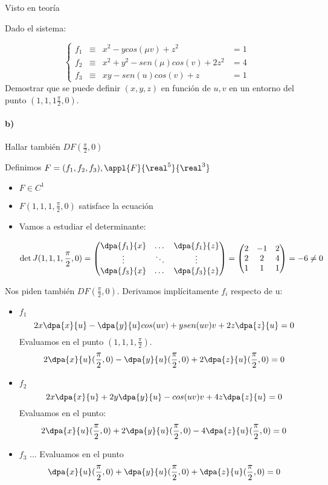  \begin{problem}[18]
 \solution
 Visto en teoría
 \end{problem}
\begin{problem}[19]
Dado el sistema:

\[\left\{\begin{array}{cccc}
	 f_1 &\equiv& x^2 -ycos(\mu v) + z^2 &= 1\\
	f_2 &\equiv &x^2+y^2-sen(\mu)cos(v)+2z^2 &= 4\\
	f_3 &\equiv &xy-sen(u)cos(v) + z &= 1 \end{array} \right.\]
Demostrar que se puede definir $(x,y,z)$ en función de $u,v$ en un entorno del punto $(1,1,1\frac{\pi}{2},0) $.

\paragraph{b)} Hallar también $DF(\frac{\pi}{2},0) $

\solution
	
Definimos $F = (f_1,f_2,f_3), \appl{F}{\real^5}{\real^3}$

\begin{itemize}
\item $F \in C^1$
\item $F(1,1,1,\frac{\pi}{2},0)$ satisface la ecuación
\item Vamos a estudiar el determinante:

\[\det J(1,1,1,\frac{\pi}{2},0) = 
	\begin{pmatrix}
		\dpa{f_1}{x} &\dots &\dpa{f_1}{z}\\
		\vdots & \ddots &\vdots\\
		\dpa{f_3}{x} & \dots & \dpa{f_3}{z}
	\end{pmatrix} =
	\begin{pmatrix}
		2&-1&2\\
		2&2&4\\
		1&1&1
	\end{pmatrix} = -6 \neq 0\]	
\end{itemize}

Nos piden también $DF(\frac{\pi}{2},0)$. Derivamos implícitamente $f_i$ respecto de u:

\begin{itemize}
\item $f_1$
\[2x\dpa{x}{u} - \dpa{y}{u}cos(uv)+ysen(uv)v + 2z\dpa{z}{u} =0\]
Evaluamos en el punto $(1,1,1,\frac{\pi}{2})$.
\[2\dpa{x}{u}(\frac{\pi}{2},0) - \dpa{y}{u}(\frac{\pi}{2},0) + 2 \dpa{z}{u}(\frac{\pi}{2},0) = 0\]
 \item $f_2$
 \[2x\dpa{x}{u} + 2y\dpa{y}{u}-cos(uv)v+4z\dpa{z}{u} = 0\]
 Evaluamos en el punto:
 \[2\dpa{x}{u} (\frac{\pi}{2},0)  + 2\dpa{y}{u}(\frac{\pi}{2},0)  - 4 \dpa{z}{u}(\frac{\pi}{2},0) = 0 \]
 \item $f_3$
 ...
 Evaluamos en el punto
 \[\dpa{x}{u}(\frac{\pi}{2},0) +\dpa{y}{u}(\frac{\pi}{2},0)  + \dpa{z}{u}(\frac{\pi}{2},0) = 0 \]
\end{itemize}


\end{problem}
